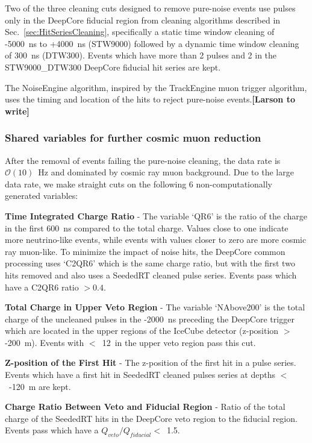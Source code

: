 \documentclass[../Main.tex]{subfiles}
\begin{document}
Two of the three cleaning cuts designed to remove pure-noise events
use pulses only in the DeepCore fiducial region from cleaning algorithms
described in Sec.~\ref{sec:HitSeriesCleaning}, specifically a static
time window cleaning of
-5000~ns to +4000~ns (STW9000) followed by a dynamic time window cleaning of
300~ns (DTW300). Events which have more than 2 pulses and 2 \pe in
the STW9000\_DTW300 DeepCore fiducial hit series are kept.

The NoiseEngine algorithm\cite{LarsonMasters}, inspired by the TrackEngine muon trigger
algorithm\cite{diva2:328163}, uses the timing and location of the hits
to reject pure-noise events.\textbf{[Larson to write]}

\subsubsection{Shared variables for further cosmic muon reduction}\label{sec:L3Variables}

After the removal of events failing the pure-noise cleaning, the
data rate is $\mathcal{O}(10)$~Hz and dominated by cosmic ray muon
background. Due to the large data rate, we make straight cuts on the
following 6 non-computationally generated variables: 

\textbf{Time Integrated Charge Ratio} - The variable `QR6' is the
ratio of the charge in the first 600~ns compared to the total
charge. Values close to one indicate more neutrino-like events, while
events with values closer to zero are more cosmic ray muon-like. To
minimize the impact of noise hits, the DeepCore common processing uses
`C2QR6' which is the same charge ratio, but with the first two hits
removed and also uses a SeededRT cleaned pulse series. Events pass which have a C2QR6 ratio $>0.4$.

\textbf{Total Charge in Upper Veto Region} - The variable `NAbove200'
is the total charge of the uncleaned pulses in the  -2000~ns
preceding the DeepCore trigger which are located in the upper regions
of the IceCube detector (z-position $>$ -200~m). Events with $<$~12~\pe in the upper veto region pass this cut.

\textbf{Z-position of the First Hit} - The z-position of the first hit in a
pulse series. Events which have a first hit in SeededRT cleaned pulses
series at depths $<$~-120~m are kept. 

\textbf{Charge Ratio Between Veto and Fiducial Region} - Ratio of the
total charge of the SeededRT hits in the DeepCore veto region to the fiducial
region.  Events pass which have a $Q_{veto}/Q_{fiducial}<$~1.5.
\end{document}
